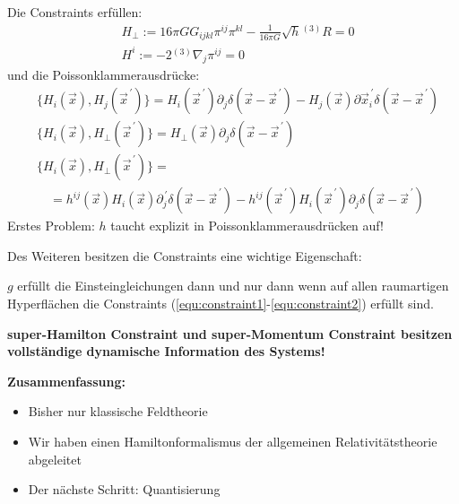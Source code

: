 \documentclass[mathserif]{beamer}
\newcommand{\inHS}{{}^{(3)}\!}
\theoremstyle{definition}
\begin{document}
	\begin{frame}
		Die Constraints erfüllen:
		\begin{align}
			&H_{\perp}:=16\pi G G_{ijkl}\pi^{ij}\pi^{kl}-\frac{1}{16\pi G}\sqrt{h}\inHS R=0 \label{equ:constraint1}\\
			&H^i:=-2\inHS\nabla_j\pi^{ij}=0 \label{equ:constraint2}
		\end{align}
		und die Poissonklammerausdrücke:
		\begin{align*}
			&\{H_i(\vec{x}),H_j(\vec{x}^{\,\prime})\}=H_i(\vec{x}^{\,\prime})\partial_j\delta(\vec{x}-\vec{x}^{\,\prime})-H_j(\vec{x})\partial\vec{x}^{\,\prime}_i\delta(\vec{x}-\vec{x}^{\,\prime})\\
			&\{H_i(\vec{x}),H_\perp(\vec{x}^{\,\prime})\}=H_\perp(\vec{x})\partial_j\delta(\vec{x}-\vec{x}^{\,\prime})\\
			&\{H_i(\vec{x}),H_\perp(\vec{x}^{\,\prime})\}=\\
			&\quad=h^{ij}(\vec{x})H_i(\vec{x})\partial^{\,\prime}_j\delta(\vec{x}-\vec{x}^{\,\prime})-h^{ij}(\vec{x}^{\,\prime})H_i(\vec{x}^{\,\prime})\partial_j\delta(\vec{x}-\vec{x}^{\,\prime})
		\end{align*}
		Erstes Problem: $h$ taucht explizit in Poissonklammerausdrücken auf!
	\end{frame}
	\begin{frame}
		Des Weiteren besitzen die Constraints eine wichtige Eigenschaft:
		\begin{theorem}
			$g$ erfüllt die Einsteingleichungen dann und nur dann wenn auf allen raumartigen Hyperflächen
			die Constraints (\ref{equ:constraint1}-\ref{equ:constraint2}) erfüllt sind.
		\end{theorem}
		\pause
		\begin{center}
			\textbf{super-Hamilton Constraint und super-Momentum Constraint besitzen vollständige dynamische Information des Systems!}
		\end{center}
	\end{frame}
	\begin{frame}
		\begin{center}
			\textbf{Zusammenfassung:}
		\end{center}
		\begin{itemize}
			\item Bisher nur klassische Feldtheorie
			\pause
			\item Wir haben einen Hamiltonformalismus der allgemeinen Relativitätstheorie abgeleitet
			\pause
			\item Der nächste Schritt: Quantisierung
		\end{itemize}
	\end{frame}
\end{document}
